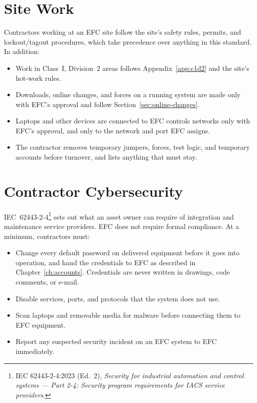\section[Site Work]{Site Work \newmark}\label{sec:contractor-site-work}
Contractors working at an EFC site follow the site's safety rules, permits, and lockout/tagout procedures, which take precedence over anything in this standard. In addition:
\begin{itemize}[itemsep=1pt]
  \item Work in Class~I, Division~2 areas follows Appendix~\ref{app:c1d2} and the site's hot-work rules.
  \item Downloads, online changes, and forces on a running system are made only with EFC's approval and follow Section~\ref{sec:online-changes}.
  \item Laptops and other devices are connected to EFC controls networks only with EFC's approval, and only to the network and port EFC assigns.
  \item The contractor removes temporary jumpers, forces, test logic, and temporary accounts before turnover, and lists anything that must stay.
\end{itemize}

\section[Contractor Cybersecurity]{Contractor Cybersecurity \newmark}\label{sec:contractor-cyber}
IEC~62443-2-4\footnote{IEC 62443-2-4:2023 (Ed.~2), \emph{Security for industrial automation and control systems --- Part 2-4: Security program requirements for IACS service providers}.} sets out what an asset owner can require of integration and maintenance service providers. EFC does not require formal compliance. At a minimum, contractors must:
\begin{itemize}[itemsep=1pt]
  \item Change every default password on delivered equipment before it goes into operation, and hand the credentials to EFC as described in Chapter~\ref{ch:accounts}. Credentials are never written in drawings, code comments, or e-mail.
  \item Disable services, ports, and protocols that the system does not use.
  \item Scan laptops and removable media for malware before connecting them to EFC equipment.
  \item Report any suspected security incident on an EFC system to EFC immediately.
\end{itemize}

